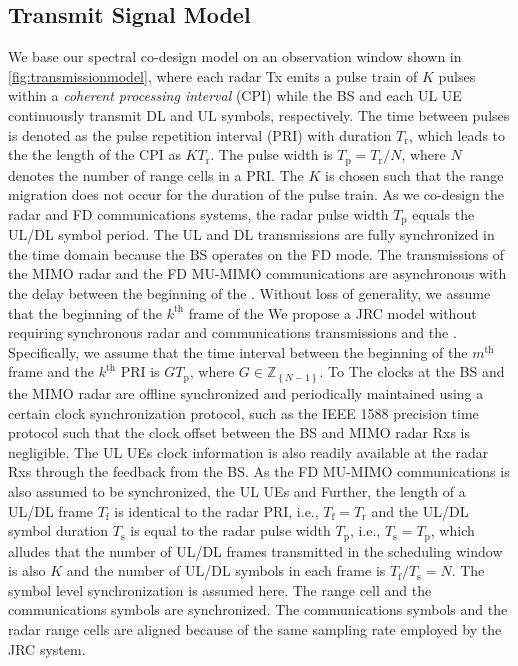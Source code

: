 \documentclass[10pt,journal]{IEEEtran}
\newcommand{\braces}[1]{{\left\{ {#1}\right\}}}
\newcommand{\ith}[1]    {{#1}^{\underline{\text{th}}}}
\newcommand{\sfrac}[2]{#1/#2}
\theoremstyle{definition}
\begin{document}
	\subsection{Transmit Signal Model}
	We base our spectral co-design model on an observation window shown in \figurename{\;\ref{fig:transmissionmodel}}, where each radar Tx emits a pulse train of $\mathit{K}$ pulses within a \textit{coherent processing interval} (CPI) while the BS and each UL UE continuously transmit DL and UL symbols, respectively. The time between  pulses is denoted as the pulse repetition interval (PRI) with duration $T_{\mathrm{r}}$, which leads to the the length of the CPI as $KT_{\mathrm{r}}$. The pulse width is $T_\mathrm{p}= T_\mathrm{r}/N$, where $N$ denotes the number of range cells in a PRI. The $\mathit{K}$ is chosen such that the range migration does not occur for the duration of the pulse train\cite{Xiaodong_Overlaid}.
	As we co-design the radar and FD communications systems, the radar pulse width $T_{\mathrm{p}}$ equals the UL/DL symbol period.  
	The UL and DL transmissions are fully synchronized in the time domain because the BS operates on the FD mode. The transmissions of the MIMO radar and the FD MU-MIMO communications are asynchronous with the delay between the beginning of the . Without loss of generality, we assume that the beginning of the $\ith{k}$ frame of the  
	\color{red}We propose a JRC model without requiring synchronous radar and communications transmissions and the . Specifically, we assume that the time interval between the beginning of the $\ith{m}$ frame and the $\ith{k}$ PRI is $GT_{\mathrm{p}}$, where $G\in\mathbb{Z}_\braces{N-1}$.  To The clocks at the BS and the MIMO radar are offline synchronized and periodically maintained using a certain clock synchronization protocol, such as the IEEE 1588 precision time protocol\cite{wang2020displaced} such that the clock offset between the BS and MIMO radar Rxs is negligible. The UL UEs clock information is also readily available at the radar Rxs through the feedback from the BS. As the FD MU-MIMO communications is also assumed to be synchronized, the UL UEs and  
	\color{black}Further, the length of a UL/DL frame $T_\mathrm{f}$ is identical to the radar PRI, i.e., $T_{\mathrm{f}}=T_{\mathrm{r}}$ and the UL/DL symbol duration $T_{\mathrm{s}}$ is equal to the radar pulse width $T_{\mathrm{p}}$, i.e., $T_{\mathrm{s}}=T_{\mathrm{p}}$, which alludes that the number of UL/DL frames transmitted in the scheduling window is also $\mathit{K}$ and the number of UL/DL symbols in each frame is $\sfrac{T_{\mathrm{f}}}{T_{\mathrm{s}}}=\mathit{N}$. The symbol level synchronization is assumed here. The range cell and the communications symbols are synchronized. The communications symbols and the radar range cells are aligned because of the same sampling rate employed by the JRC system.
\end{document}
